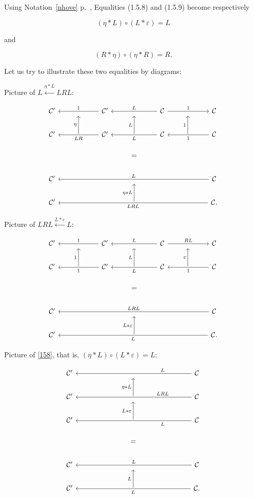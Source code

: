 \documentclass[12pt]{article}%
\theoremstyle{remark}
\theoremstyle{definition}
\newcommand{\nn}{\noindent}
\newcommand{\C}{\mathcal C}
\newcommand{\ee}{\varepsilon}
\begin{document}
Using Notation~\ref{nhove} p.~\pageref{nhove}, Equalities (1.5.8) and (1.5.9) become respectively 

\begin{equation}\label{158}
(\eta*L)\circ(L*\ee)=L
\end{equation}

\nn and 

\begin{equation}\label{159}
(R*\eta)\circ(\eta*R)=R.
\end{equation}

Let us try to illustrate these two equalities by diagrams:

Picture of $L\xleftarrow{\eta*L}LRL$:
 
$$
\begin{tikzcd}
%
\C'&{}&\C'\ar{ll}{}[swap]{1}&{}&\C\ar{ll}{}[swap]{L}\ar{rr}{}{1}&{}&\C\\ 
%
\C'&\ar{u}{\eta}&\C'\ar{ll}{}{LR}&\ar{u}{L}&\C\ar{ll}{}{L}&\ar{u}{1}&\C\ar{ll}{}{1}\\ 
%
&&&=\\ 
%
\C'&&&{}&&&\C\ar{llllll}[swap]{L}\\
%
\C'&&&\ar{u}{\eta*L}&&&\C\ar{llllll}{LRL}.
%
\end{tikzcd}
$$ 

Picture of $LRL\xleftarrow{L*\ee}L$:
 
$$
\begin{tikzcd}
%
\C'&{}&\C'\ar{ll}{}[swap]{1}&{}&\C\ar{ll}{}[swap]{L}\ar{rr}{}{RL}&{}&\C\\ 
%
\C'&\ar{u}{1}&\C'\ar{ll}{}{1}&\ar{u}{L}&\C\ar{ll}{}{L}&\ar{u}{\ee}&\C\ar{ll}{}{1}\\ 
%
&&&=\\ 
%
\C'&&&{}&&&\C\ar{llllll}[swap]{LRL}\\
%
\C'&&&\ar{u}{L*\ee}&&&\C\ar{llllll}{L}.
%
\end{tikzcd}
$$ 

Picture of \eqref{158}, that is, $(\eta*L)\circ(L*\ee)=L$:

$$
\begin{tikzcd}
%
\C'&&&{}&&&\C\ar{llllll}[near start,swap]{L}\\
%
\C'&&&\ar{u}{\eta*L}&&&\C\ar{llllll}[near start,swap]{LRL}\\
%
\C'&&&\ar{u}{L*\ee}&&&\C\ar{llllll}[near start]{L}\\ 
%
&&&=\\ 
%
\C'&&&{}&&&\C\ar{llllll}[swap]{L}\\ 
%
\C'&&&\ar{u}{L}&&&\C.\ar{llllll}{L}
%
\end{tikzcd}
$$ 
\end{document}
